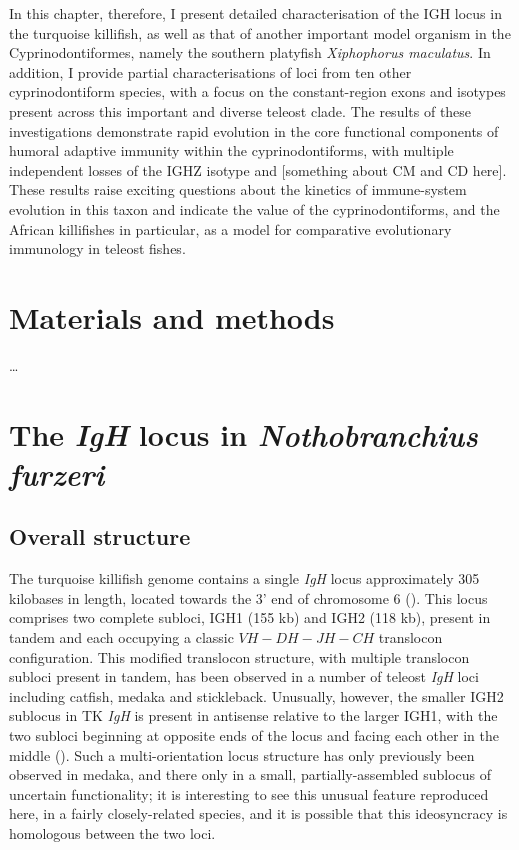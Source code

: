 In this chapter, therefore, I present detailed characterisation of the IGH locus in the turquoise killifish, as well as that of another important model organism in the Cyprinodontiformes, namely the southern platyfish \textit{Xiphophorus maculatus}. In addition, I provide partial characterisations of loci from ten other cyprinodontiform species, with a focus on the constant-region exons and isotypes present across this important and diverse teleost clade. The results of these investigations demonstrate rapid evolution in the core functional components of humoral adaptive immunity within the cyprinodontiforms, with multiple independent losses of the IGHZ isotype and [something about CM and CD here]. These results raise exciting questions about the kinetics of immune-system evolution in this taxon and indicate the value of the cyprinodontiforms, and the African killifishes in particular, as a model for comparative evolutionary immunology in teleost fishes. 

\section{Materials and methods} %

\dots
\pagebreak



\section{The \textit{IgH} locus in \textit{Nothobranchius furzeri}}
\label{sec:nfu-locus}


	\subsection{Overall structure}
	\label{sec:nfu-locus-structure}
	
	The turquoise killifish genome contains a single \textit{IgH} locus approximately 305 kilobases in length, located towards the 3' end of chromosome 6 ().
	This locus comprises two complete subloci, IGH1 (155 kb) and IGH2 (118 kb), present in tandem and each occupying a classic ${VH-DH-JH-CH}$ translocon configuration. This modified translocon structure, with multiple translocon subloci present in tandem, has been observed in a number of teleost \textit{IgH} loci including catfish, medaka and stickleback. Unusually, however, the smaller IGH2 sublocus in TK \textit{IgH} is present in antisense relative to the larger IGH1, with the two subloci beginning at opposite ends of the locus and facing each other in the middle (). Such a multi-orientation locus structure has only previously been observed in medaka, and there only in a small, partially-assembled sublocus of uncertain functionality; it is interesting to see this unusual feature reproduced here, in a fairly closely-related species, and it is possible that this ideosyncracy is homologous between the two loci. %
	
